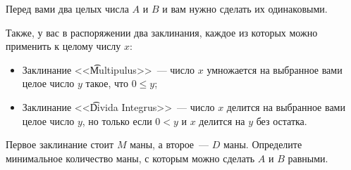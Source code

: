 Перед вами два целых числа $A$ и $B$ и вам нужно сделать их одинаковыми. 

Также, у вас в распоряжении два заклинания, каждое из которых можно применить к целому числу $x$:

\begin{itemize}
\item Заклинание <<\t{Multipulus}>>~--- число $x$ умножается на выбранное вами целое число $y$ такое, что $0 \leq y$;

\item Заклинание <<\t{Divida Integrus}>>~--- число $x$ делится на выбранное вами целое число $y$, но только если $0 < y$ и $x$ делится на $y$ без остатка.
\end{itemize}

Первое заклинание стоит $M$ маны, а второе~--- $D$ маны. Определите минимальное количество маны, с которым можно сделать $A$ и $B$ равными.